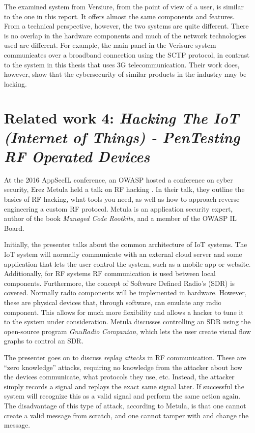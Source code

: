 The examined system from Versiure, from the point of view of a user, is similar to the one in this report. It offers almost the same components and features. From a technical perspective, however, the two systems are quite different. There is no overlap in the hardware components and much of the network technologies used are different. For example, the main panel in the Verisure system communicates over a broadband connection using the SCTP protocol, in contrast to the system in this thesis that uses 3G telecommunication. Their work does, however, show that the cybersecurity of similar products in the industry may be lacking.

\section{Related work 4: \textit{Hacking The IoT (Internet of Things) - PenTesting RF Operated Devices}} \label{ch:related-work:hacking-iot}
At the 2016 AppSecIL conference, an OWASP hosted a conference on cyber security, Erez Metula held a talk on RF hacking \cite{hacking-the-iot-talk}. In their talk, they outline the basics of RF hacking, what tools you need, as well as how to approach reverse engineering a custom RF protocol. Metula is an application security expert, author of the book \textit{Managed Code Rootkits}, and a member of the OWASP IL Board.

Initially, the presenter talks about the common architecture of IoT systems. The IoT system will normally communicate with an external cloud server and some application that lets the user control the system, such as a mobile app or website. Additionally, for RF systems RF communication is used between local components. Furthermore, the concept of Software Defined Radio's (\gls{SDR}) is covered. Normally radio components will be implemented in hardware. However, these are physical devices that, through software, can emulate any radio component. This allows for much more flexibility and allows a hacker to tune it to the system under consideration. Metula discusses controlling an SDR using the open-source program \textit{GnuRadio Companion}, which lets the user create visual flow graphs to control an SDR.

The presenter goes on to discuss \textit{replay attacks} in RF communication. These are \enquote{zero knowledge} attacks, requiring no knowledge from the attacker about how the devices communicate, what protocols they use, etc. Instead, the attacker simply records a signal and replays the exact same signal later. If successful the system will recognize this as a valid signal and perform the same action again. The disadvantage of this type of attack, according to Metula, is that one cannot create a valid message from scratch, and one cannot tamper with and change the message.

